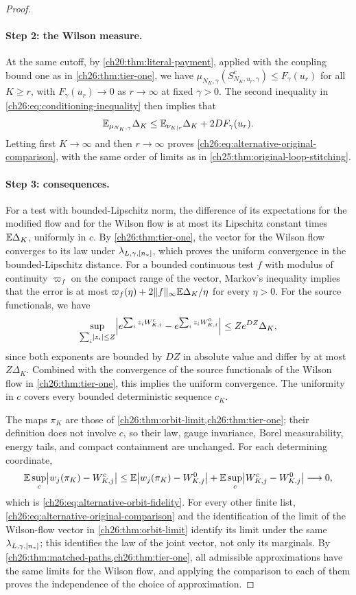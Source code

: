 \begin{proof}
\paragraph{Step 2: the Wilson measure.}
At the same cutoff, by \cref{ch20:thm:literal-payment}, applied with the coupling bound one as in \cref{ch26:thm:tier-one}, we have $\mu_{N_K,\gamma}(S^c_{N_K,u_r,\gamma})\le F_\gamma(u_r)$ for all $K\ge r$, with $F_\gamma(u_r)\to0$ as $r\to\infty$ at fixed $\gamma>0$. The second inequality in \eqref{ch26:eq:conditioning-inequality} then implies that
\[
 \mathbb E_{\mu_{N_K,\gamma}}\Delta_K\le\mathbb E_{\nu_{K\mid r}}\Delta_K+2DF_\gamma(u_r).
\]
Letting first $K\to\infty$ and then $r\to\infty$ proves \eqref{ch26:eq:alternative-original-comparison}, with the same order of limits as in \cref{ch25:thm:original-loop-stitching}.

\paragraph{Step 3: consequences.}
For a test with bounded-Lipschitz norm, the difference of its expectations for the modified flow and for the Wilson flow is at most its Lipschitz constant times $\mathbb E\Delta_K$, uniformly in $c$. By \cref{ch26:thm:tier-one}, the vector for the Wilson flow converges to its law under $\lambda_{L,\gamma,[n_*]}$, which proves the uniform convergence in the bounded-Lipschitz distance. For a bounded continuous test $f$ with modulus of continuity $\varpi_f$ on the compact range of the vector, Markov's inequality implies that the error is at most $\varpi_f(\eta)+2\lVert f\rVert_\infty\mathbb E\Delta_K/\eta$ for every $\eta>0$. For the source functionals, we have
\[
 \sup_{\sum_i\lvert z_i\rvert\le Z}\Bigl\lvert e^{\sum_iz_iW^c_{K,i}}-e^{\sum_iz_iW^0_{K,i}}\Bigr\rvert\le Ze^{DZ}\Delta_K,
\]
since both exponents are bounded by $DZ$ in absolute value and differ by at most $Z\Delta_K$. Combined with the convergence of the source functionals of the Wilson flow in \cref{ch26:thm:tier-one}, this implies the uniform convergence. The uniformity in $c$ covers every bounded deterministic sequence $c_K$.

The maps $\pi_K$ are those of \cref{ch26:thm:orbit-limit,ch26:thm:tier-one}; their definition does not involve $c$, so their law, gauge invariance, Borel measurability, energy tails, and compact containment are unchanged. For each determining coordinate,
\[
 \mathbb E\sup_c\bigl\lvert w_j(\pi_K)-W^c_{K,j}\bigr\rvert\le\mathbb E\bigl\lvert w_j(\pi_K)-W^0_{K,j}\bigr\rvert+\mathbb E\sup_c\bigl\lvert W^c_{K,j}-W^0_{K,j}\bigr\rvert\longrightarrow0,
\]
which is \eqref{ch26:eq:alternative-orbit-fidelity}. For every other finite list, \eqref{ch26:eq:alternative-original-comparison} and the identification of the limit of the Wilson-flow vector in \cref{ch26:thm:orbit-limit} identify its limit under the same $\lambda_{L,\gamma,[n_*]}$; this identifies the law of the joint vector, not only its marginals. By \cref{ch26:thm:matched-paths,ch26:thm:tier-one}, all admissible approximations have the same limits for the Wilson flow, and applying the comparison to each of them proves the independence of the choice of approximation.
\end{proof}

